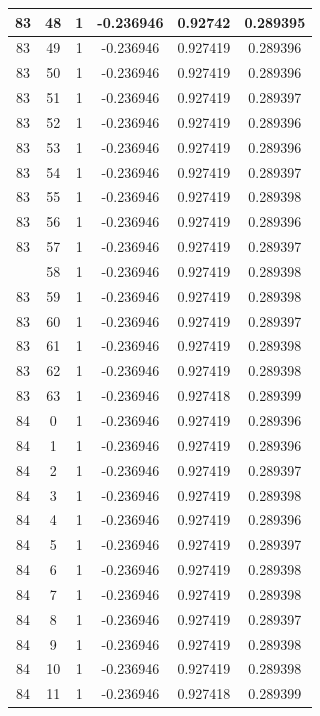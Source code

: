 \documentclass[12pt,a4paper]{article}
\numberwithin{equation}{section}
\numberwithin{figure}{section}
\numberwithin{table}{section}
\begin{document}
\begin{longtable}{|c|c|c|c|c|c|}
83 & 48 & 1 & -0.236946 & 0.92742 & 0.289395 \\ \hline
83 & 49 & 1 & -0.236946 & 0.927419 & 0.289396 \\ \hline
83 & 50 & 1 & -0.236946 & 0.927419 & 0.289396 \\ \hline
83 & 51 & 1 & -0.236946 & 0.927419 & 0.289397 \\ \hline
83 & 52 & 1 & -0.236946 & 0.927419 & 0.289396 \\ \hline
83 & 53 & 1 & -0.236946 & 0.927419 & 0.289396 \\ \hline
83 & 54 & 1 & -0.236946 & 0.927419 & 0.289397 \\ \hline
83 & 55 & 1 & -0.236946 & 0.927419 & 0.289398 \\ \hline
83 & 56 & 1 & -0.236946 & 0.927419 & 0.289396 \\ \hline
83 & 57 & 1 & -0.236946 & 0.927419 & 0.289397 \\ \hline
\pagebreak
83 & 58 & 1 & -0.236946 & 0.927419 & 0.289398 \\ \hline
83 & 59 & 1 & -0.236946 & 0.927419 & 0.289398 \\ \hline
83 & 60 & 1 & -0.236946 & 0.927419 & 0.289397 \\ \hline
83 & 61 & 1 & -0.236946 & 0.927419 & 0.289398 \\ \hline
83 & 62 & 1 & -0.236946 & 0.927419 & 0.289398 \\ \hline
83 & 63 & 1 & -0.236946 & 0.927418 & 0.289399 \\ \hline
84 & 0 & 1 & -0.236946 & 0.927419 & 0.289396 \\ \hline
84 & 1 & 1 & -0.236946 & 0.927419 & 0.289396 \\ \hline
84 & 2 & 1 & -0.236946 & 0.927419 & 0.289397 \\ \hline
84 & 3 & 1 & -0.236946 & 0.927419 & 0.289398 \\ \hline
84 & 4 & 1 & -0.236946 & 0.927419 & 0.289396 \\ \hline
84 & 5 & 1 & -0.236946 & 0.927419 & 0.289397 \\ \hline
84 & 6 & 1 & -0.236946 & 0.927419 & 0.289398 \\ \hline
84 & 7 & 1 & -0.236946 & 0.927419 & 0.289398 \\ \hline
84 & 8 & 1 & -0.236946 & 0.927419 & 0.289397 \\ \hline
84 & 9 & 1 & -0.236946 & 0.927419 & 0.289398 \\ \hline
84 & 10 & 1 & -0.236946 & 0.927419 & 0.289398 \\ \hline
84 & 11 & 1 & -0.236946 & 0.927418 & 0.289399 \\ \hline

\end{longtable}
\end{document}
